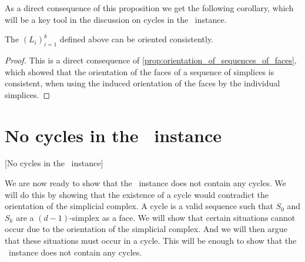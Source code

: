 As a direct consequence of this proposition we get the following corollary, which will be a key tool in the discussion on cycles in the \EndOfLine\ instance.

\begin{corollary}
    The $\left(L_i\right)_{i=1}^{k}$ defined above can be oriented consistently.
\end{corollary}
\begin{proof}
    This is a direct consequence of \cref{prop:orientation_of_sequences_of_faces}, which showed that the orientation of the faces of a sequence of simplices is consistent, when using the induced orientation of the faces by the individual simplices.
\end{proof}

\section{No cycles in the \EndOfLine\ instance}[No cycles in the \EndOfLine\ instance]

We are now ready to show that the \EndOfLine\ instance does not contain any cycles. We will do this by showing that the existence of a cycle would contradict the orientation of the simplicial complex. A cycle is a valid sequence such that $S_0$ and $S_k$ are a $(d-1)$-simplex as a face. We will show that certain situations cannot occur due to the orientation of the simplicial complex. And we will then argue that these situations must occur in a cycle. This will be enough to show that the \EndOfLine\ instance does not contain any cycles.

